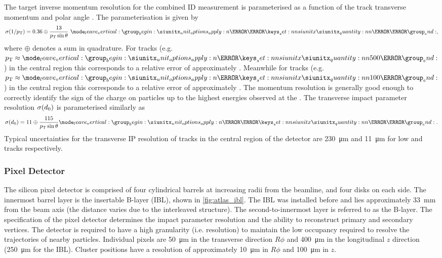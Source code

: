 The target inverse momentum resolution for the combined ID measurement is parameterised as a function of the track transverse momentum and polar angle \cite{ATLAS-TDR-14}.
The parameterisation is given by
%
\begin{equation}
  \sigma(1/\pt) = 0.36 \oplus \frac{13}{\pt \sin\theta} ~\SI{}{\per\TeV} ,
\end{equation}
%
where $\oplus$ denotes a sum in quadrature.
For \lowpt tracks (e.g. $\pt \approx \SI{500}{\MeV}$) in the central region this corresponds to a relative error of approximately .
Meanwhile for \highpt tracks (e.g. $\pt \approx \SI{100}{\GeV}$) in the central region this corresponds to a relative error of approximately .
The momentum resolution is generally good enough to correctly identify the sign of the charge on particles up to the highest energies observed at the \LHC.
The transverse impact parameter resolution $\sigma(d_{0})$ is parameterised similarly as
%
\begin{equation}
  \sigma(\dzero) = 11 \oplus \frac{115}{\pt \sin\theta} \SI{}{\micro\meter} .
\end{equation}
%
Typical uncertainties for the transverse IP resolution of tracks in the central region of the detector are \SI{230}{\micro\meter} and \SI{11}{\micro\meter} for low and \highpt tracks respectively.

\subsubsection{Pixel Detector}
The silicon pixel detector is comprised of four cylindrical barrels at increasing radii from the beamline, and four disks on each side.
The innermost barrel layer is the insertable B-layer (IBL), shown in \cref{fig:atlas_ibl}.
The IBL was installed before \runtwo \cite{ATLAS-TDR-19,PIX-2018-001} and lies approximately \SI{33}{\milli\meter} from the beam axis (the distance varies due to the interleaved structure).
The second-to-innermost layer is referred to as the B-layer.
The specification of the pixel detector determines the impact parameter resolution and the ability to reconstruct primary and secondary vertices.
The detector is required to have a high granularity (i.e. resolution) to maintain the low occupancy required to resolve the trajectories of nearby particles. %
Individual pixels are \SI{50}{\micro\meter} in the transverse direction $R\phi$ and \SI{400}{\micro\meter} in the longitudinal $z$ direction (\SI{250}{\micro\meter} for the IBL).
Cluster positions have a resolution of approximately \SI{10}{\micro\meter} in $R\phi$ and \SI{100}{\micro\meter} in $z$.

